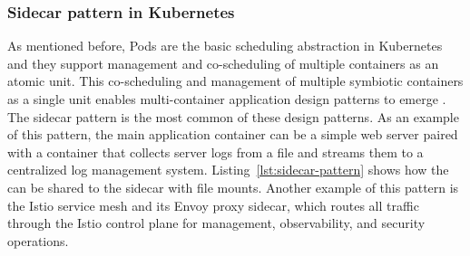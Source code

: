 \documentclass[english, 12pt, a4paper, sci, utf8, a-2b, online]{aaltothesis}
\begin{document}
\subsubsection{Sidecar pattern in Kubernetes}

As mentioned before, Pods are the basic scheduling abstraction in Kubernetes and they support management and co-scheduling of multiple containers as an atomic unit.
This co-scheduling and management of multiple symbiotic containers as a single unit enables multi-container application design patterns to emerge \cite{burns2016design}.
The sidecar pattern is the most common of these design patterns.
As an example of this pattern, the main application container can be a simple web server paired with a container that collects server logs from a file and streams them to a centralized log management system.
Listing~\ref{lst:sidecar-pattern} shows how the can be shared to the sidecar with file mounts.
Another example of this pattern is the Istio service mesh \cite{istio} and its Envoy proxy sidecar, which routes all traffic through the Istio control plane for management, observability, and security operations.



\end{document}
